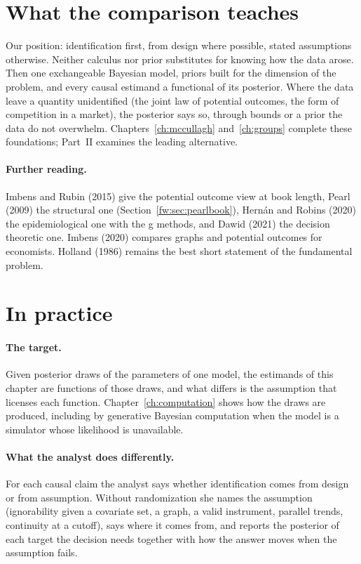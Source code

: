 \section{What the comparison teaches}\label{fw:sec:discussion}

Our position: identification first, from design where possible, stated assumptions otherwise. Neither calculus nor prior substitutes for knowing how the data arose. Then one exchangeable Bayesian model, priors built for the dimension of the problem, and every causal estimand a functional of its posterior. Where the data leave a quantity unidentified (the joint law of potential outcomes, the form of competition in a market), the posterior says so, through bounds or a prior the data do not overwhelm. Chapters~\ref{ch:mccullagh} and~\ref{ch:groups} complete these foundations; Part~II examines the leading alternative.

\paragraph{Further reading.} Imbens and Rubin (2015) give the potential outcome view at book length, Pearl (2009) the structural one (Section~\ref{fw:sec:pearlbook}), Hern\'an and Robins (2020) the epidemiological one with the g methods, and Dawid (2021) the decision theoretic one. Imbens (2020) compares graphs and potential outcomes for economists. Holland (1986) remains the best short statement of the fundamental problem.

\section{In practice}

\paragraph{The target.} Given posterior draws of the parameters of one model, the estimands of this chapter are functions of those draws, and what differs is the assumption that licenses each function. Chapter~\ref{ch:computation} shows how the draws are produced, including by generative Bayesian computation when the model is a simulator whose likelihood is unavailable.

\paragraph{What the analyst does differently.} For each causal claim the analyst says whether identification comes from design or from assumption. Without randomization she names the assumption (ignorability given a covariate set, a graph, a valid instrument, parallel trends, continuity at a cutoff), says where it comes from, and reports the posterior of each target the decision needs together with how the answer moves when the assumption fails.

